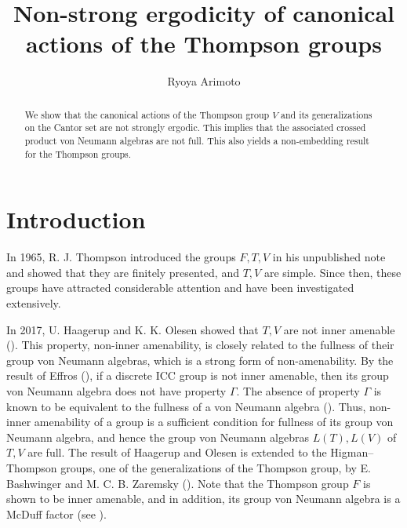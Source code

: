 \documentclass{amsart}
\title{Non-strong ergodicity of canonical actions of the Thompson groups}
\author{Ryoya Arimoto}
\theoremstyle{remark}
\theoremstyle{definition}
\begin{document}
\begin{abstract}
We show that the canonical actions of the Thompson group $V$ and its generalizations on the Cantor set are not strongly ergodic.
This implies that the associated crossed product von Neumann algebras are not full.
This also yields a non-embedding result for the Thompson groups.
\end{abstract}

\maketitle

\section{Introduction}
In 1965, R. J. Thompson introduced the groups $F, T, V$ in his unpublished note and showed that they are finitely presented, and $T, V$ are simple.
Since then, these groups have attracted considerable attention and have been investigated extensively.

In 2017, U. Haagerup and K. K. Olesen showed that $T, V$ are not inner amenable (\cite{HaagerupOlesen}).
This property, non-inner amenability, is closely related to the fullness of their group von Neumann algebras, which is a strong form of non-amenability.
By the result of Effros (\cite{Effros}), if a discrete ICC group is not inner amenable, then its group von Neumann algebra does not have property $\Gamma$.
The absence of property $\Gamma$ is known to be equivalent to the fullness of a von Neumann algebra (\cite[Corollary 3.8]{Connes}).
Thus, non-inner amenability of a group is a sufficient condition for fullness of its group von Neumann algebra, and hence the group von Neumann algebras $L(T), L(V)$ of $T, V$ are full.
The result of Haagerup and Olesen is extended to the Higman--Thompson groups, one of the generalizations of the Thompson group, by E. Bashwinger and M. C. B. Zaremsky (\cite{BashwingerZaremsky}).
Note that the Thompson group $F$ is shown to be inner amenable, and in addition, its group von Neumann algebra is a McDuff factor (see \cite{Jolissaint}).
\end{document}
